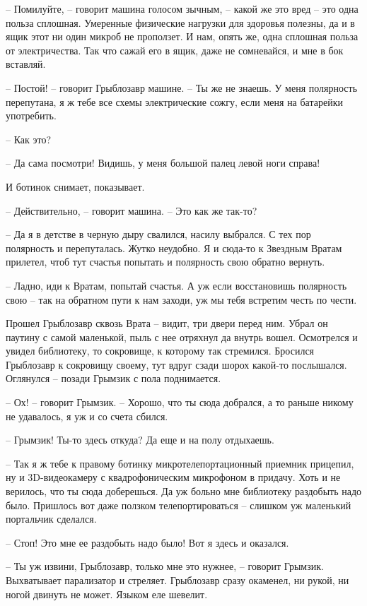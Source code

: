 \documentclass[ebook,oneside,final,openright]{memoir}
\begin{document}
– Помилуйте, – говорит машина голосом зычным, – какой же это вред – это одна польза сплошная. Умеренные физические нагрузки для здоровья полезны, да и в ящик этот ни один микроб не проползет. И нам, опять же, одна сплошная польза от электричества. Так что сажай его в ящик, даже не сомневайся, и мне в бок вставляй. \par
– Постой! – говорит Грыблозавр машине. – Ты же не знаешь. У меня полярность перепутана, я ж тебе все схемы электрические сожгу, если меня на батарейки употребить. \par
– Как это? \par
– Да сама посмотри! Видишь, у меня большой палец левой ноги справа! \par
И ботинок снимает, показывает. \par
– Действительно, – говорит машина. – Это как же так-то? \par
– Да я в детстве в черную дыру свалился, насилу выбрался. С тех пор полярность и перепуталась. Жутко неудобно. Я и сюда-то к Звездным Вратам прилетел, чтоб тут счастья попытать и полярность свою обратно вернуть. \par
– Ладно, иди к Вратам, попытай счастья. А уж если восстановишь полярность свою – так на обратном пути к нам заходи, уж мы тебя встретим честь по чести.\par
\par
Прошел Грыблозавр сквозь Врата – видит, три двери перед ним. Убрал он паутину с самой маленькой, пыль с нее отряхнул да внутрь вошел. Осмотрелся и увидел библиотеку, то сокровище, к которому так стремился. Бросился Грыблозавр к сокровищу своему, тут вдруг сзади шорох какой-то послышался. Оглянулся – позади Грымзик с пола поднимается.\par
– Ох! – говорит Грымзик. – Хорошо, что ты сюда добрался, а то раньше никому не удавалось, я уж и со счета сбился.\par
– Грымзик! Ты-то здесь откуда? Да еще и на полу отдыхаешь.\par
– Так я ж тебе к правому ботинку микротелепортационный приемник прицепил, ну и 3D-видеокамеру с квадрофоническим микрофоном в придачу. Хоть и не верилось, что ты сюда доберешься. Да уж больно мне библиотеку раздобыть надо было. Пришлось вот даже ползком телепортироваться – слишком уж маленький портальчик сделался.\par
– Стоп! Это мне ее раздобыть надо было! Вот я здесь и оказался.\par
– Ты уж извини, Грыблозавр, только мне это нужнее, – говорит Грымзик. Выхватывает парализатор и стреляет. Грыблозавр сразу окаменел, ни рукой, ни ногой двинуть не может. Языком еле шевелит.\par
\end{document}
